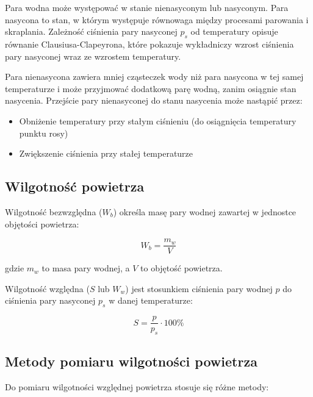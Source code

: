 \documentclass[a4paper,12pt]{article}
\begin{document}
Para wodna może występować w stanie nienasyconym lub nasyconym. Para nasycona to stan, w którym występuje równowaga między procesami parowania i skraplania. Zależność ciśnienia pary nasyconej $p_s$ od temperatury opisuje równanie Clausiusa-Clapeyrona, które pokazuje wykładniczy wzrost ciśnienia pary nasyconej wraz ze wzrostem temperatury.

Para nienasycona zawiera mniej cząsteczek wody niż para nasycona w tej samej temperaturze i może przyjmować dodatkową parę wodną, zanim osiągnie stan nasycenia. Przejście pary nienasyconej do stanu nasycenia może nastąpić przez:
\begin{itemize}
    \item Obniżenie temperatury przy stałym ciśnieniu (do osiągnięcia temperatury punktu rosy)
    \item Zwiększenie ciśnienia przy stałej temperaturze
\end{itemize}

\subsection{Wilgotność powietrza}

Wilgotność bezwzględna ($W_b$) określa masę pary wodnej zawartej w jednostce objętości powietrza:

\begin{equation}
    W_b = \frac{m_w}{V}
\end{equation}

gdzie $m_w$ to masa pary wodnej, a $V$ to objętość powietrza.

Wilgotność względna ($S$ lub $W_w$) jest stosunkiem ciśnienia pary wodnej $p$ do ciśnienia pary nasyconej $p_s$ w danej temperaturze:

\begin{equation}
    S = \frac{p}{p_s} \cdot 100\%
\end{equation}


\subsection{Metody pomiaru wilgotności powietrza}

Do pomiaru wilgotności względnej powietrza stosuje się różne metody:
\end{document}
